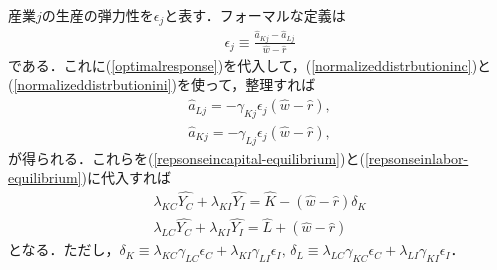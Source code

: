 \documentclass[12pt,a4paper]{jsarticle}
\begin{document}
産業$j$の生産の弾力性を$\epsilon_{j}$と表す．フォーマルな定義は
\begin{align}
	\epsilon_{j} \equiv \frac{\hat{a}_{Kj} - \hat{a}_{Lj}}{\hat{w} - \hat{r}}
\end{align}
である．これに(\ref{optimalresponse})を代入して，(\ref{normalizeddistrbutioninc})と(\ref{normalizeddistrbutionini})を使って，整理すれば
\begin{align}
	\hat{a}_{Lj} = -\gamma_{Kj} \epsilon_{j} (\hat{w} - \hat{r}), \\
	\hat{a}_{Kj} = -\gamma_{Lj} \epsilon_{j} (\hat{w} - \hat{r}),
\end{align}
が得られる．これらを(\ref{repsonseincapital-equilibrium})と(\ref{repsonseinlabor-equilibrium})に代入すれば
\begin{align}
	\lambda_{KC} \hat{Y_{C}}  +\lambda_{KI} \hat{Y_{I}}  = \hat{K} -(\hat{w} - \hat{r}) \delta_{K}  \label{repsonseincapital-equilibriumwithe}\\
	\lambda_{LC} \hat{Y_{C}}  +\lambda_{KI} \hat{Y_{I}}  = \hat{L} +(\hat{w} - \hat{r}) \label{repsonseinlabor-equilibriumwithe}
\end{align}
となる．ただし，$\delta_{K} \equiv \lambda_{KC} \gamma_{LC} \epsilon_{C} + \lambda_{KI} \gamma_{LI} \epsilon_{I}, \, \delta_{L} \equiv \lambda_{LC} \gamma_{KC} \epsilon_{C} + \lambda_{LI} \gamma_{KI} \epsilon_{I}$．
\end{document}
